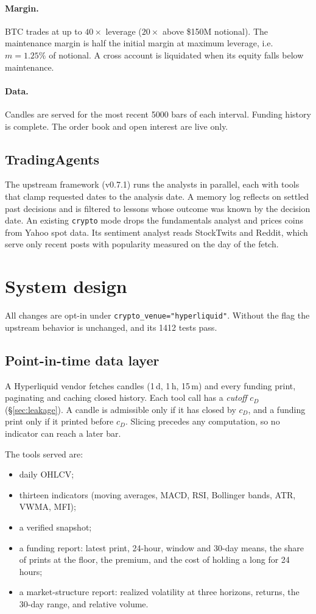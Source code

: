 \documentclass[11pt]{article}
\theoremstyle{remark}
\begin{document}
\paragraph{Margin.} BTC trades at up to $40\times$ leverage ($20\times$ above \$150M notional). The maintenance margin is half the initial margin at maximum leverage, i.e.\ $m = 1.25\%$ of notional. A cross account is liquidated when its equity falls below maintenance.

\paragraph{Data.} Candles are served for the most recent 5000 bars of each interval. Funding history is complete. The order book and open interest are live only.

\subsection{TradingAgents}
The upstream framework (v0.7.1) runs the analysts in parallel, each with tools that clamp requested dates to the analysis date. A memory log reflects on settled past decisions and is filtered to lessons whose outcome was known by the decision date. An existing \texttt{crypto} mode drops the fundamentals analyst and prices coins from Yahoo spot data. Its sentiment analyst reads StockTwits and Reddit, which serve only recent posts with popularity measured on the day of the fetch.

\section{System design}\label{sec:design}

All changes are opt-in under \texttt{crypto\_venue="hyperliquid"}. Without the flag the upstream behavior is unchanged, and its 1412 tests pass.

\subsection{Point-in-time data layer}
A Hyperliquid vendor fetches candles (1\,d, 1\,h, 15\,m) and every funding print, paginating and caching closed history. Each tool call has a \emph{cutoff} $c_D$ (\S\ref{sec:leakage}). A candle is admissible only if it has closed by $c_D$, and a funding print only if it printed before $c_D$. Slicing precedes any computation, so no indicator can reach a later bar.

The tools served are:
\begin{itemize}
\item daily OHLCV;
\item thirteen indicators (moving averages, MACD, RSI, Bollinger bands, ATR, VWMA, MFI);
\item a verified snapshot;
\item a funding report: latest print, 24-hour, window and 30-day means, the share of prints at the floor, the premium, and the cost of holding a long for 24 hours;
\item a market-structure report: realized volatility at three horizons, returns, the 30-day range, and relative volume.
\end{itemize}
\end{document}
